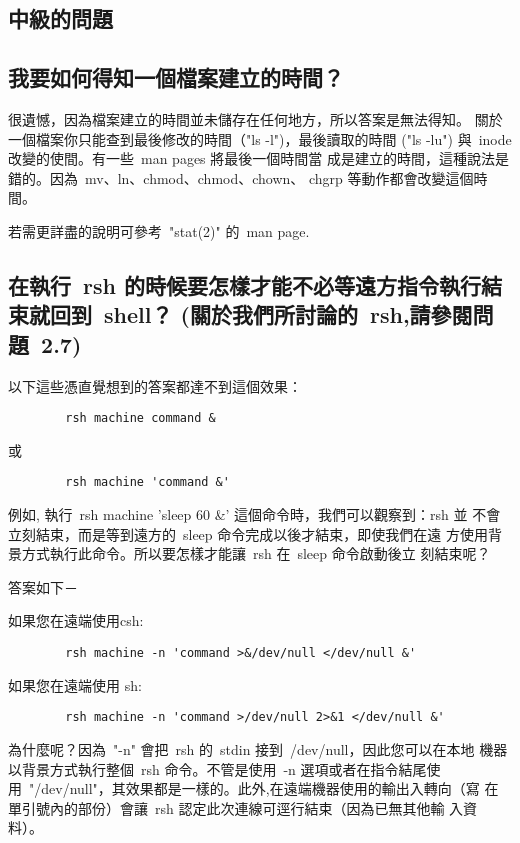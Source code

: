 \documentclass{article}
\begin{document}
\begin{CJK*}{Bg5}{ming}
\section{中級的問題}
\subsection{我要如何得知一個檔案建立的時間？}

	很遺憾，因為檔案建立的時間並未儲存在任何地方，所以答案是無法得知。
	關於一個檔案你只能查到最後修改的時間（"ls -l")，最後讀取的時間
        ("ls -lu") 與~inode 改變的使間。有一些~man pages 將最後一個時間當
        成是建立的時間，這種說法是錯的。因為~mv、ln、chmod、chmod、chown、
        chgrp 等動作都會改變這個時間。

	若需更詳盡的說明可參考~"stat(2)" 的~man page.

\subsection{在執行~rsh 的時候要怎樣才能不必等遠方指令執行結束就回到~shell？
        (關於我們所討論的~rsh,請參閱問題~2.7)}

	以下這些憑直覺想到的答案都達不到這個效果：
\begin{verbatim}
		rsh machine command &
\end{verbatim}
	或	
\begin{verbatim}
		rsh machine 'command &'
\end{verbatim}
	例如, 執行~rsh machine 'sleep 60 \&' 這個命令時，我們可以觀察到：rsh 並
	不會立刻結束，而是等到遠方的~sleep 命令完成以後才結束，即使我們在遠
	方使用背景方式執行此命令。所以要怎樣才能讓~rsh 在~sleep 命令啟動後立
	刻結束呢？

	答案如下－

	如果您在遠端使用csh:
\begin{verbatim}
		rsh machine -n 'command >&/dev/null </dev/null &'
\end{verbatim}

	如果您在遠端使用 sh:
\begin{verbatim}
		rsh machine -n 'command >/dev/null 2>&1 </dev/null &'
\end{verbatim}

	為什麼呢？因為~"-n" 會把~rsh 的~stdin 接到~/dev/null，因此您可以在本地
	機器以背景方式執行整個~rsh 命令。不管是使用~-n 選項或者在指令結尾使
	用~"/dev/null"，其效果都是一樣的。此外,在遠端機器使用的輸出入轉向（寫
	在單引號內的部份）會讓~rsh 認定此次連線可逕行結束（因為已無其他輸
	入資料）。


\end{CJK*}
\end{document}
